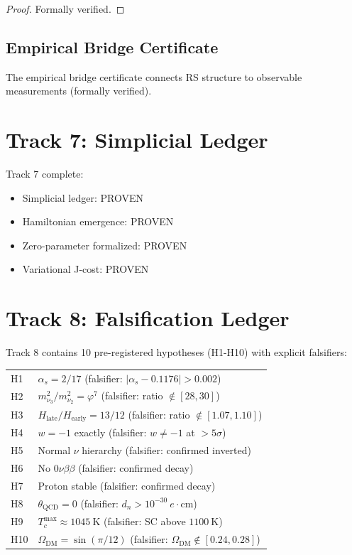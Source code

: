 \documentclass[12pt,a4paper]{article}
\theoremstyle{definition}
\theoremstyle{remark}
\begin{document}
\begin{proof}
Formally verified.
\end{proof}

\subsection{Empirical Bridge Certificate}

The empirical bridge certificate connects RS structure to 
observable measurements (formally verified).

\section{Track 7: Simplicial Ledger}

Track 7 complete:
\begin{itemize}
\item Simplicial ledger: PROVEN
\item Hamiltonian emergence: PROVEN
\item Zero-parameter formalized: PROVEN
\item Variational J-cost: PROVEN
\end{itemize}

\section{Track 8: Falsification Ledger}

Track 8 contains 10 pre-registered hypotheses (H1-H10) with explicit falsifiers:

\begin{center}
\begin{tabular}{ll}
\hline
H1 & $\alpha_s = 2/17$ (falsifier: $|\alpha_s - 0.1176| > 0.002$) \\
H2 & $m_{\nu_3}^2/m_{\nu_2}^2 = \varphi^7$ (falsifier: ratio $\notin [28, 30]$) \\
H3 & $H_\mathrm{late}/H_\mathrm{early} = 13/12$ (falsifier: ratio $\notin [1.07, 1.10]$) \\
H4 & $w = -1$ exactly (falsifier: $w \neq -1$ at $>5\sigma$) \\
H5 & Normal $\nu$ hierarchy (falsifier: confirmed inverted) \\
H6 & No $0\nu\beta\beta$ (falsifier: confirmed decay) \\
H7 & Proton stable (falsifier: confirmed decay) \\
H8 & $\theta_\mathrm{QCD} = 0$ (falsifier: $d_n > 10^{-30}~e\cdot\text{cm}$) \\
H9 & $T_c^\mathrm{max} \approx 1045~\text{K}$ (falsifier: SC above $1100~\text{K}$) \\
H10 & $\Omega_\mathrm{DM} = \sin(\pi/12)$ (falsifier: $\Omega_\mathrm{DM} \notin [0.24, 0.28]$) \\
\hline
\end{tabular}
\end{center}
\end{document}
